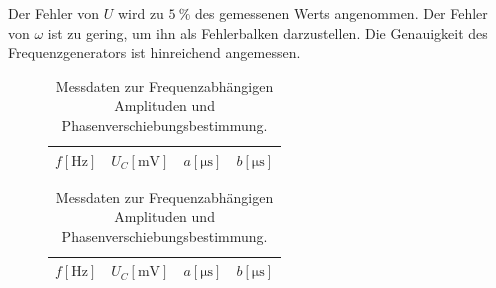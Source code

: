 Der Fehler von $U$ wird zu $\SI{5}{\percent}$ des gemessenen Werts angenommen.
Der Fehler von $\omega$ ist zu gering, um ihn als Fehlerbalken darzustellen.
Die Genauigkeit des Frequenzgenerators ist hinreichend angemessen.
%
%    
%

\begin{table}
  \hspace*{\fill}
  \begin{subfigure}{0.40\textwidth}
  \centering
  \label{tab:2a}
  \begin{tabular}{c c c c}
    \toprule
     {$f [\si{\hertz}]$} & {$U_C [\si{\milli\volt}]$} & {$a [\si{\micro\second}]$} & {$b [\si{\micro\second}]$}\\
    \midrule
    
    \bottomrule
  \end{tabular}
\end{subfigure}
\hspace*{\fill}
\begin{subfigure}{0.40\textwidth}
  \centering
  \label{tab:2b}
  \begin{tabular}{c c c c}
    \toprule
    {$f [\si{\hertz}]$} & {$U_C [\si{\milli\volt}]$} & {$a [\si{\micro\second}]$} & {$b [\si{\micro\second}]$}\\
    \midrule
    
    \bottomrule
  \end{tabular}
\end{subfigure}
\\
\hspace*{\fill}
\hspace*{\fill}
\caption{Messdaten zur Frequenzabhängigen Amplituden und Phasenverschiebungsbestimmung.}
\label{tab:2}
\end{table}
%    


